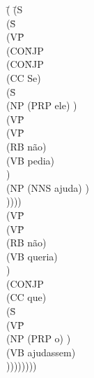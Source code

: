 \begin{figure}[!ht]
    \centering
    \begin{minipage}{.35\textwidth}
            \begin{tabbing}
                \=( \=(S \+\\
                \>  (S\=\+\\ 
                \>   (VP\=\+\\ 
                \>    (CO\=NJP\+\\ 
                \>     (CO\=NJP\+\\ 
                \>      (CC Se)\\
                \>      (S\=\+\\ 
                \>       (NP (PRP ele) )\\
                \>       (VP\=\+\\ 
                \>        (VP\=\+\\ 
                \>         (RB não)\\
                \>         (VB pedia)\-\\
                \>        )\\
                \>        (NP (NNS ajuda) )\-\\
                \>       ))))\-\-\-\\
                \>    (VP\=\+\\ 
                \>     (VP\=\+\\ 
                \>      (RB não)\\
                \>      (VB queria)\-\\
                \>     )\\
                \>     (CO\=NJP\+\\ 
                \>      (CC que)\\
                \>      (S\=\+\\ 
                \>       (VP\=\+\\ 
                \>        (NP (PRP o) )\\
                \>        (VB ajudassem)\\
                \>       ))))))))\-
            \end{tabbing}
    \end{minipage}
    \begin{minipage}{.55\textwidth}
            \begin{tabbing}

\end{tabbing}
\end{minipage}
\end{figure}
